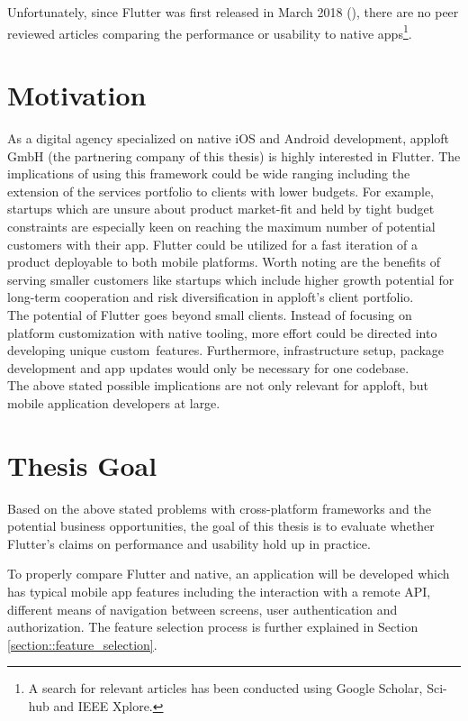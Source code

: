 Unfortunately, since Flutter was first released in March 2018 (\cite{FlutterReleases2020}), 
there are no peer reviewed articles comparing the performance or usability to native apps\footnote{A search for relevant articles has been conducted using Google Scholar, Sci-hub and IEEE Xplore.}. 

\section{Motivation}
As a digital agency specialized on native iOS and Android development, apploft GmbH 
(the partnering company of this thesis) is highly interested in Flutter. 
The implications of using this framework could be wide ranging including the extension of the services portfolio
to clients with lower budgets.
For example, startups which are unsure about product market-fit and held by tight budget constraints are especially keen on reaching 
the maximum number of potential customers with their app. Flutter could be utilized for a fast iteration of a product deployable to 
both mobile platforms. 
Worth noting are the benefits of serving smaller customers like startups which include higher growth potential for long-term cooperation
and risk diversification in apploft's client portfolio.\\
The potential of Flutter goes beyond small clients. Instead of focusing on platform customization with native tooling, more effort could 
be directed into developing unique custom features.
Furthermore, infrastructure setup, package development and app updates would only be necessary for one codebase.\\
The above stated possible implications are not only relevant for apploft, but mobile application developers at large.

\section{Thesis Goal}
Based on the above stated problems with cross-platform frameworks and the potential business opportunities, the goal of this thesis is to evaluate 
whether Flutter's claims on performance and usability hold up in practice.

To properly compare Flutter and native, an application will be developed which has
typical mobile app features including the interaction with a remote API, different means of navigation between screens, 
user authentication and authorization. The feature selection process is further explained in Section \ref{section::feature_selection}.

